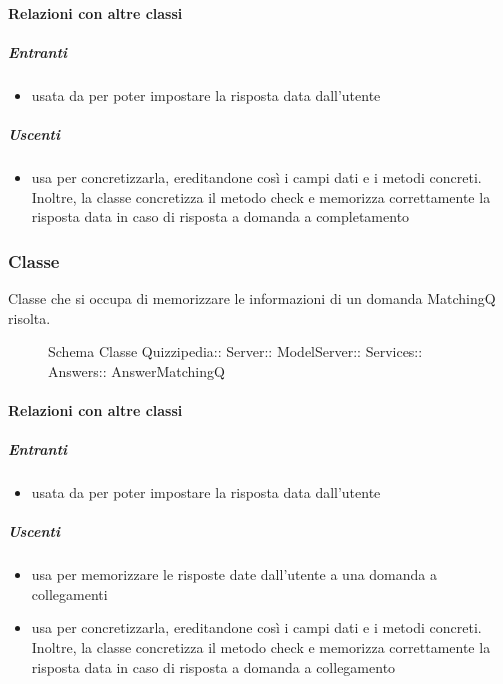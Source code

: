 \paragraph{Relazioni con altre classi}
\subparagraph{Entranti}
\begin{itemize}
\item usata da  per poter impostare la risposta data dall'utente
\end{itemize}
\subparagraph{Uscenti}
\begin{itemize}
\item usa  per concretizzarla, ereditandone così i campi dati e i metodi concreti. Inoltre, la classe concretizza il metodo check e memorizza correttamente la risposta data in caso di risposta a domanda a completamento
\end{itemize}
\subsubsection{Classe }
Classe che si occupa di memorizzare le informazioni di un domanda MatchingQ risolta.
\begin{figure}[H]
\centering
\noindent{}
\caption[Schema Classe AnswerMatchingQ]{Schema Classe Quizzipedia:: Server:: ModelServer:: Services:: Answers:: AnswerMatchingQ}
\end{figure}
\paragraph{Relazioni con altre classi}
\subparagraph{Entranti}
\begin{itemize}
\item usata da  per poter impostare la risposta data dall'utente
\end{itemize}
\subparagraph{Uscenti}
\begin{itemize}
\item usa  per memorizzare le risposte date dall'utente a una domanda a collegamenti
\item usa  per concretizzarla, ereditandone così i campi dati e i metodi concreti. Inoltre, la classe concretizza il metodo check e memorizza correttamente la risposta data in caso di risposta a domanda a collegamento
\end{itemize}
